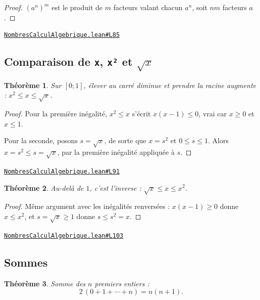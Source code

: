 \documentclass[11pt,a4paper]{article}
\theoremstyle{definition}
\theoremstyle{plain}
\newtheorem{theoreme}{Théorème}
\newcommand{\source}[2]{\par\smallskip\noindent\hfill{\footnotesize\href{#1}{\texttt{#2}}}\par\smallskip}
\begin{document}
\begin{proof}
$(a^n)^m$ est le produit de $m$ facteurs valant chacun $a^n$, soit $nm$ facteurs
$a$.
\end{proof}
\source{https://github.com/Commutator-IO/learn-lean/blob/main/courses/02-lycee/01-nombres-calcul-algebrique/NombresCalculAlgebrique.lean\#L85}{NombresCalculAlgebrique.lean\#L85}

\subsection{Comparaison de \texttt{x}, \texttt{x²} et \texttt{\(\sqrt{x}\)}}

\begin{theoreme}
Sur $[0 ; 1]$, élever au carré diminue et prendre la racine augmente :
$x^2 \le x \le \sqrt x$.
\end{theoreme}

\begin{proof}
Pour la première inégalité, $x^2 \le x$ s'écrit $x(x - 1) \le 0$, vrai car $x \ge 0$ et
$x \le 1$.

Pour la seconde, posons $s = \sqrt x$, de sorte que $x = s^2$ et $0 \le s \le 1$. Alors
$x = s^2 \le s = \sqrt x$, par la première inégalité appliquée à $s$.
\end{proof}
\source{https://github.com/Commutator-IO/learn-lean/blob/main/courses/02-lycee/01-nombres-calcul-algebrique/NombresCalculAlgebrique.lean\#L91}{NombresCalculAlgebrique.lean\#L91}

\begin{theoreme}
Au-delà de $1$, c'est l'inverse : $\sqrt x \le x \le x^2$.
\end{theoreme}

\begin{proof}
Même argument avec les inégalités renversées : $x(x-1) \ge 0$ donne $x \le x^2$, et
$s = \sqrt x \ge 1$ donne $s \le s^2 = x$.
\end{proof}
\source{https://github.com/Commutator-IO/learn-lean/blob/main/courses/02-lycee/01-nombres-calcul-algebrique/NombresCalculAlgebrique.lean\#L103}{NombresCalculAlgebrique.lean\#L103}

\subsection{Sommes}

\begin{theoreme}
Somme des $n$ premiers entiers :
\[ 2\,(0 + 1 + \cdots + n) = n(n+1) . \]
\end{theoreme}
\end{document}
